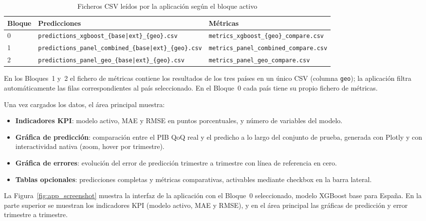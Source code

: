 \begin{table}[H]
\centering
\caption{Ficheros CSV leídos por la aplicación según el bloque activo}
\label{tab:app_csvs}
\small
\begin{tabular}{lll}
\hline
\textbf{Bloque} & \textbf{Predicciones} & \textbf{Métricas} \\
\hline
0 & \texttt{predictions\_xgboost\_\{base|ext\}\_\{geo\}.csv}       & \texttt{metrics\_xgboost\_\{geo\}\_compare.csv} \\
1 & \texttt{predictions\_panel\_combined\_\{base|ext\}\_\{geo\}.csv} & \texttt{metrics\_panel\_combined\_compare.csv}  \\
2 & \texttt{predictions\_panel\_geo\_\{base|ext\}\_\{geo\}.csv}      & \texttt{metrics\_panel\_geo\_compare.csv}       \\
\hline
\end{tabular}
\end{table}

En los Bloques~1 y~2 el fichero de métricas contiene los resultados de los tres países en
un único CSV (columna \texttt{geo}); la aplicación filtra automáticamente las filas
correspondientes al país seleccionado. En el Bloque~0 cada país tiene su propio fichero
de métricas.

Una vez cargados los datos, el área principal muestra:

\begin{itemize}
    \item \textbf{Indicadores KPI}: modelo activo, MAE y RMSE en puntos porcentuales,
          y número de variables del modelo.
    \item \textbf{Gráfica de predicción}: comparación entre el PIB QoQ real y el
          predicho a lo largo del conjunto de prueba, generada con Plotly y con
          interactividad nativa (zoom, hover por trimestre).
    \item \textbf{Gráfica de errores}: evolución del error de predicción trimestre a
          trimestre con línea de referencia en cero.
    \item \textbf{Tablas opcionales}: predicciones completas y métricas comparativas,
          activables mediante checkbox en la barra lateral.
\end{itemize}

La Figura~\ref{fig:app_screenshot} muestra la interfaz de la aplicación con el Bloque~0
seleccionado, modelo XGBoost base para España. En la parte superior se muestran los
indicadores KPI (modelo activo, MAE y RMSE), y en el área principal las gráficas de
predicción y error trimestre a trimestre.

